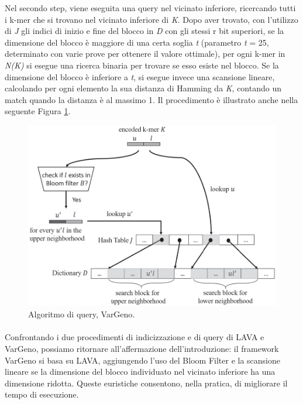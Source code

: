 \documentclass[../main.tex]{subfiles}
\begin{document}
Nel secondo step, viene eseguita una query nel vicinato inferiore, ricercando tutti i k-mer che si trovano nel vicinato inferiore di \textit{K}. Dopo aver trovato, con l'utilizzo di \textit{J} gli indici di inizio e fine del blocco in \textit{D} con gli stessi r bit superiori, se la dimensione del blocco è maggiore di una certa soglia \textit{t} (parametro \textit{t} = 25, determinato con varie prove per ottenere il valore ottimale), per ogni k-mer in \textit{N(K)} si esegue una ricerca binaria per trovare se esso esiste nel blocco. Se la dimensione del blocco è inferiore a \textit{t}, si esegue invece una scansione lineare, calcolando per ogni elemento la sua distanza di Hamming da \textit{K}, contando un match quando la distanza è al massimo 1. Il procedimento è illustrato anche nella seguente Figura \ref{fig:vargeno}.

\begin{figure}[h!]
	\centering
  	\captionsetup{justification=centering}
  	\includegraphics[scale=.40]{images/vargeno-query.png}
  	\caption{Algoritmo di query, VarGeno.}
  	\label{fig:vargeno}
\end{figure}

\paragraph{}
Confrontando i due procedimenti di indicizzazione e di query di LAVA e VarGeno, possiamo ritornare all'affermazione dell'introduzione: il framework VarGeno si basa su LAVA, aggiungendo l'uso del Bloom Filter e la scansione lineare se la dimensione del blocco individuato nel vicinato inferiore ha una dimensione ridotta. Queste euristiche consentono, nella pratica, di migliorare il tempo di esecuzione.
\end{document}
